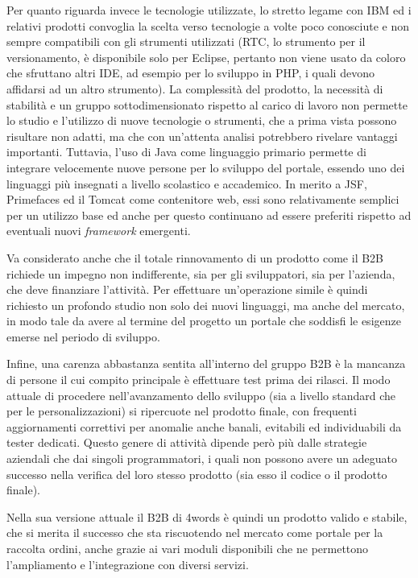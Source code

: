 Per quanto riguarda invece le tecnologie utilizzate, lo stretto legame con IBM ed i relativi prodotti convoglia la scelta verso tecnologie a volte poco conosciute e non sempre compatibili con gli strumenti utilizzati (RTC, lo strumento per il versionamento, è disponibile solo per Eclipse, pertanto non viene usato da coloro che sfruttano altri IDE, ad esempio per lo sviluppo in PHP, i quali devono affidarsi ad un altro strumento). La complessità del prodotto, la necessità di stabilità e un gruppo sottodimensionato rispetto al carico di lavoro non permette lo studio e l'utilizzo di nuove tecnologie o strumenti, che a prima vista possono risultare non adatti, ma che con un'attenta analisi potrebbero rivelare vantaggi importanti. Tuttavia, l'uso di Java come linguaggio primario permette di integrare velocemente nuove persone per lo sviluppo del portale, essendo uno dei linguaggi più insegnati a livello scolastico e accademico. In merito a JSF, Primefaces ed il Tomcat come contenitore web, essi sono relativamente semplici per un utilizzo base ed anche per questo continuano ad essere preferiti rispetto ad eventuali nuovi \textit{framework} emergenti.

Va considerato anche che il totale rinnovamento di un prodotto come il B2B richiede un impegno non indifferente, sia per gli sviluppatori, sia per l'azienda, che deve finanziare l'attività. Per effettuare un'operazione simile è quindi richiesto un profondo studio non solo dei nuovi linguaggi, ma anche del mercato, in modo tale da avere al termine del progetto un portale che soddisfi le esigenze emerse nel periodo di sviluppo.

Infine, una carenza abbastanza sentita all'interno del gruppo B2B è la mancanza di persone il cui compito principale è effettuare test prima dei rilasci. Il modo attuale di procedere nell'avanzamento dello sviluppo (sia a livello standard che per le personalizzazioni) si ripercuote nel prodotto finale, con frequenti aggiornamenti correttivi per anomalie anche banali, evitabili ed individuabili da tester dedicati. Questo genere di attività dipende però più dalle strategie aziendali che dai singoli programmatori, i quali non possono avere un adeguato successo nella verifica del loro stesso prodotto (sia esso il codice o il prodotto finale).

Nella sua versione attuale il B2B di 4words è quindi un prodotto valido e stabile, che si merita il successo che sta riscuotendo nel mercato come portale per la raccolta ordini, anche grazie ai vari moduli disponibili che ne permettono l'ampliamento e l'integrazione con diversi servizi.


